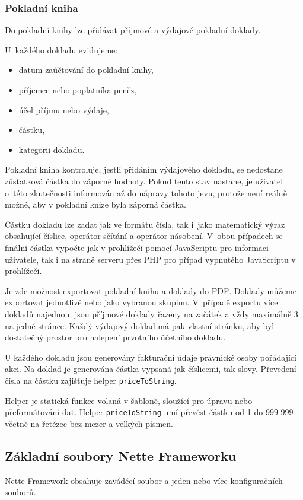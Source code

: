\documentclass[thesis=B,czech]{FITthesis}[2012/04/27]
\begin{document}
\subsubsection{Pokladní kniha}
Do pokladní knihy lze přidávat příjmové a výdajové pokladní doklady.

U~každého dokladu evidujeme:

\begin{itemize}
	\item datum zaúčtování do pokladní knihy,
	\item příjemce nebo poplatníka peněz,
	\item účel příjmu nebo výdaje,
	\item částku,
	\item kategorii dokladu.
\end{itemize}
Pokladní kniha kontroluje, jestli přidáním výdajového dokladu, se nedostane zůstatková částka do záporné hodnoty. Pokud tento stav nastane, je uživatel o~této zkutečnosti informován až do nápravy tohoto jevu, protože není reálně možné, aby v pokladní knize byla záporná částka.

Částku dokladu lze zadat jak ve formátu čísla, tak i~jako matematický výraz obsahující číslice, operátor sčítání a operátor násobení. V~obou případech se finální částka vypočte jak v prohlížeči pomocí JavaScriptu pro informaci uživatele, tak i na straně serveru přes PHP pro případ vypnutého JavaScriptu v prohlížeči.

Je zde možnost exportovat pokladní knihu a doklady do PDF. Doklady můžeme exportovat jednotlivě nebo jako vybranou skupinu. V~případě exportu více dokladů najednou, jsou příjmové doklady řazeny na začátek a vždy maximálně 3 na jedné stránce. Každý výdajový doklad má pak vlastní stránku, aby byl dostatečný prostor pro nalepení prvotního účetního dokladu.

U každého dokladu jsou generovány fakturační údaje právnické osoby pořádající akci. Na doklad je generována částka vypsaná jak číslicemi, tak slovy. Převedení čísla na částku zajišťuje helper \texttt{priceToString}. 

Helper je statická funkce volaná v šabloně, sloužící pro úpravu nebo přeformátování dat. Helper \texttt{priceToString} umí převést částku od 1 do 999 999 včetně na řetězec bez mezer a velkých písmen.

\subsection{Základní soubory Nette Frameworku}
Nette Framework obsahuje zaváděcí soubor a jeden nebo více konfiguračních souborů. 
 
\end{document}
